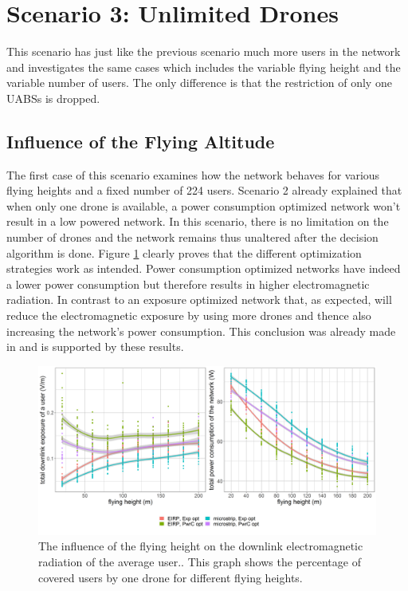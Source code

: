 \section{Scenario 3: Unlimited Drones}
\label{s3}

This scenario has just like the previous scenario much more users in the network 
and investigates the same cases which includes the variable flying height and the variable number of  users.
The only difference is that the restriction of only one \gls{UABS}s is dropped.

\subsection{Influence of the Flying Altitude}
\label{S3A}

The first case of this scenario examines how the network behaves for various flying heights and a fixed number of 224 users.
Scenario 2 already explained that when only one drone is available, a power consumption optimized network won’t result in a low 
powered network. In this scenario, there is no limitation on the number of drones and the network remains thus unaltered after the decision 
algorithm is done. Figure \ref{fig:s3a_dlAndPc} clearly proves that the different optimization strategies work as intended.
Power consumption optimized networks have indeed a lower power consumption but therefore results in higher electromagnetic radiation.
In contrast to an exposure optimized network that, as expected, will reduce the electromagnetic exposure by using more drones and thence also increasing the network's power consumption.
This conclusion was already made  in \cite{J1} and is supported by these results.

\begin{figure}[h!]
  \includegraphics[width=\textwidth]{../results/s3/fhvsdlAndPc.png}
  \caption{The influence of the flying height on the downlink electromagnetic radiation of the average user.. This graph shows the percentage of covered users by one drone for different flying heights.}
  \label{fig:s3a_dlAndPc}
\end{figure}

